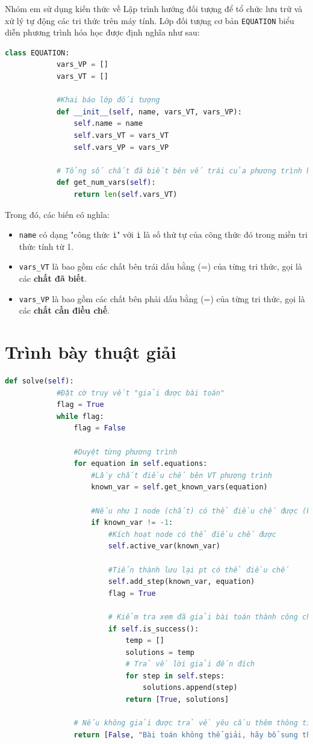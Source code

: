 \documentclass[a4paper]{article}
\begin{document}
	Nhóm em sử dụng kiến thức về Lập trình hướng đối tượng để tổ chức lưu trữ và xử lý tự động các tri thức trên máy tính. Lớp đối tượng cơ bản \texttt{EQUATION} biểu diễn phương trình hóa học được định nghĩa như sau:
	\begin{lstlisting}[language=Python, caption=Lớp đối tượng \texttt{EQUATION}]
		class EQUATION:
			vars_VP = []
			vars_VT = []
			
			#Khai báo lớp đối tượng
			def __init__(self, name, vars_VT, vars_VP):
				self.name = name
				self.vars_VT = vars_VT
				self.vars_VP = vars_VP
			
			# Tổng số chất đã biết bên vế trái của phương trình hóa học
			def get_num_vars(self):
				return len(self.vars_VT)
	\end{lstlisting}
	Trong đó, các biến có nghĩa:
	\begin{itemize}
		\item \texttt{name} có dạng "công thức \texttt{i}" với \texttt{i} là số thứ tự của công thức đó trong miền tri thức tính từ 1.
		\item \texttt{vars\_VT} là bao gồm các chất bên trái dấu bằng (=) của từng tri thức, gọi là các \textbf{chất đã biết}.
		\item \texttt{vars\_VP} là bao gồm các chất bên phải dấu bằng (=) của từng tri thức, gọi là các \textbf{chất cần điều chế}.
	\end{itemize}
	
	\section{Trình bày thuật giải}
	\begin{lstlisting}[language=Python, caption=Thuật giải mạng ngữ nghĩa điều chế]
		def solve(self):
			#Đặt cờ truy vết "giải được bài toán"
			flag = True
			while flag:
				flag = False
					
				#Duyệt từng phương trình
				for equation in self.equations:
					#Lấy chất điều chế bên VT phương trình
					known_var = self.get_known_vars(equation)
					
					#Nếu như 1 node (chất) có thể điều chế được (khác -1)
					if known_var != -1:
						#Kích hoạt node có thể điều chế được
						self.active_var(known_var)
						
						#Tiến thành lưu lại pt có thể điều chế
						self.add_step(known_var, equation)
						flag = True
						
						# Kiểm tra xem đã giải bài toán thành công chưa?
						if self.is_success():
							temp = []
							solutions = temp
							# Trả về lời giải đến đích
							for step in self.steps:
								solutions.append(step)
							return [True, solutions]
						
				# Nếu không giải được trả về yêu cầu thêm thông tin, tri thức
				return [False, "Bài toán không thể giải, hãy bổ sung thêm thông tin hoặc tri thức."]
	\end{lstlisting}
	
\end{document}

